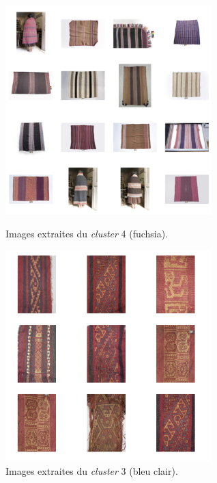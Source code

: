 \begin{figure}[!h]
 \begin{minipage}[c]{.5\linewidth}
        \begin{center}
        		\includegraphics[width=8cm]{../images/YOLO_NS_KMEAN_4.png}
		\caption{Images extraites du \textit{cluster} 4 (fuchsia).}
		\label{fig:c4}
	\end{center}
    \end{minipage}
    \hspace{5pt}
    \begin{minipage}[c]{.5\linewidth}
        \begin{center}
        		\includegraphics[width=8cm]{../images/YOLO_NS_KMEAN_3.png}
		\caption{Images extraites du \textit{cluster} 3 (bleu clair).}
		\label{fig:c3}
	\end{center}
    \end{minipage}
\end{figure}

